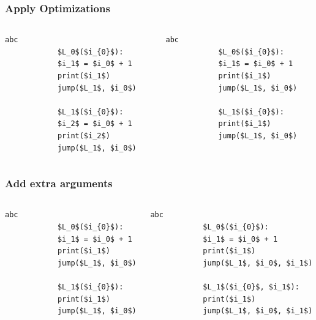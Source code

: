 \documentclass[utf8x]{beamer}
\begin{document}
\begin{frame}[fragile]
  \frametitle{Apply Optimizations}
    \begin{columns}
    \begin{column}{0.5\textwidth}
      \centering
            \begin{lstlisting}[mathescape]%,numbers = right,basicstyle=\setstretch{1.05}\ttfamily\scriptsize]
            abc
            $L_0$($i_{0}$):
            $i_1$ = $i_0$ + 1
            print($i_1$)
            jump($L_1$, $i_0$)

            $L_1$($i_{0}$):
            $i_2$ = $i_0$ + 1
            print($i_2$)
            jump($L_1$, $i_0$)
            \end{lstlisting}
    \end{column}
    \pause
    \begin{column}{0.5\textwidth}
      \centering
            \begin{lstlisting}[mathescape]%,numbers = right,basicstyle=\setstretch{1.05}\ttfamily\scriptsize]
            abc
            $L_0$($i_{0}$):
            $i_1$ = $i_0$ + 1
            print($i_1$)
            jump($L_1$, $i_0$)

            $L_1$($i_{0}$):
            print($i_1$)
            jump($L_1$, $i_0$)
            \end{lstlisting}
    \end{column}
  \end{columns}
\end{frame}

\begin{frame}[fragile]
  \frametitle{Add extra arguments}
    \begin{columns}
    \begin{column}{0.5\textwidth}
      \centering
            \begin{lstlisting}[mathescape]%,numbers = right,basicstyle=\setstretch{1.05}\ttfamily\scriptsize]
            abc
            $L_0$($i_{0}$):
            $i_1$ = $i_0$ + 1
            print($i_1$)
            jump($L_1$, $i_0$)

            $L_1$($i_{0}$):
            print($i_1$)
            jump($L_1$, $i_0$)
            \end{lstlisting}
    \end{column}
    \pause
    \begin{column}{0.5\textwidth}
      \centering
            \begin{lstlisting}[mathescape]%,numbers = right,basicstyle=\setstretch{1.05}\ttfamily\scriptsize]
            abc
            $L_0$($i_{0}$):
            $i_1$ = $i_0$ + 1
            print($i_1$)
            jump($L_1$, $i_0$, $i_1$)

            $L_1$($i_{0}$, $i_1$):
            print($i_1$)
            jump($L_1$, $i_0$, $i_1$)
            \end{lstlisting}
    \end{column}
  \end{columns}
\end{frame}
\end{document}
